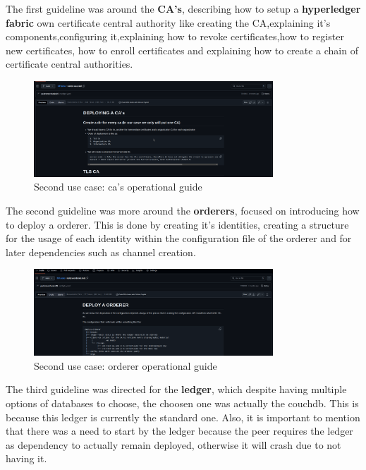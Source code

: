 The first guideline was around the \textbf{CA's}, describing how to setup a \textbf{hyperledger fabric} own certificate central authority like creating the CA,explaining it's components,configuring it,explaining how to revoke certificates,how to register new certificates, how to enroll certificates and explaining how to create a chain of certificate central authorities.

\begin{figure}[H]
    \centering
    \includegraphics[width=0.8\textwidth]{assets/use-case-2/notes-cas.png} %
    \caption{Second use case: ca's operational guide}
    \label{fig:sample-image} 
\end{figure}

The second guideline was more around the \textbf{orderers}, focused on introducing how to deploy a orderer. This is done by creating it's identities, creating a structure for the usage of each identity within the configuration file of the orderer and for later dependencies such as channel creation.

\begin{figure}[H]
    \centering
    \includegraphics[width=0.8\textwidth]{assets/use-case-2/notes-orderer.png} %
    \caption{Second use case: orderer operational guide}
    \label{fig:sample-image} 
\end{figure}

The third guideline was directed for the \textbf{ledger}, which despite having multiple options of databases to choose, the choosen one was actually the couchdb. This is because this ledger is currently the standard one. Also, it is important to mention that there was a need to start by the ledger because the peer requires the ledger as dependency to actually remain deployed, otherwise it will crash due to not having it.

